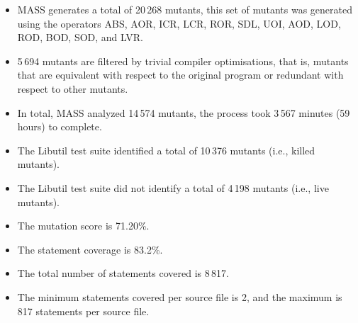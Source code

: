 \begin{itemize}
	\item MASS generates a total of 20\,268 mutants, this set of mutants was generated using the operators ABS, AOR, ICR, LCR, ROR, SDL, UOI, AOD, LOD, ROD, BOD, SOD, and LVR.

	\item 5\,694 mutants are filtered by trivial compiler optimisations, that is, mutants that are equivalent with respect to the original program or redundant with respect to other mutants.

	\item In total, MASS analyzed 14\,574 mutants, the process took 3\,567 minutes (59 hours) to complete.

	\item The Libutil test suite identified a total of 10\,376 mutants (i.e., killed mutants).

	\item The Libutil test suite did not identify a total of 4\,198 mutants (i.e., live mutants).

	\item The mutation score is 71.20\%.

	\item The statement coverage is 83.2\%.
	
	\item The total number of statements covered is 8\,817.
	
	\item The minimum statements covered per source file is 2, and the maximum is 817 statements per source file.
\end{itemize}



